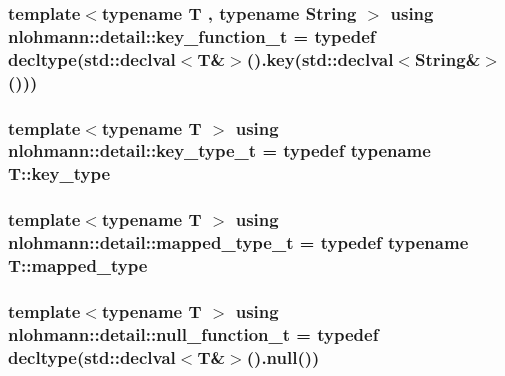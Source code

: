 \subsubsection[{\texorpdfstring{key\+\_\+function\+\_\+t}{key_function_t}}]{\setlength{\rightskip}{0pt plus 5cm}template$<$typename T , typename String $>$ using {\bf nlohmann\+::detail\+::key\+\_\+function\+\_\+t} = typedef decltype(std\+::declval$<$T\&$>$().key(std\+::declval$<$String\&$>$()))}\hypertarget{namespacenlohmann_1_1detail_a44869ca9f422b260625d78e4e8121559}{}\label{namespacenlohmann_1_1detail_a44869ca9f422b260625d78e4e8121559}
\subsubsection[{\texorpdfstring{key\+\_\+type\+\_\+t}{key_type_t}}]{\setlength{\rightskip}{0pt plus 5cm}template$<$typename T $>$ using {\bf nlohmann\+::detail\+::key\+\_\+type\+\_\+t} = typedef typename T\+::key\+\_\+type}\hypertarget{namespacenlohmann_1_1detail_a66dfe39f03b05d6b7265a0ff748d64ef}{}\label{namespacenlohmann_1_1detail_a66dfe39f03b05d6b7265a0ff748d64ef}
\subsubsection[{\texorpdfstring{mapped\+\_\+type\+\_\+t}{mapped_type_t}}]{\setlength{\rightskip}{0pt plus 5cm}template$<$typename T $>$ using {\bf nlohmann\+::detail\+::mapped\+\_\+type\+\_\+t} = typedef typename T\+::mapped\+\_\+type}\hypertarget{namespacenlohmann_1_1detail_a9c1795c148875722f8482d39e0eb9364}{}\label{namespacenlohmann_1_1detail_a9c1795c148875722f8482d39e0eb9364}
\subsubsection[{\texorpdfstring{null\+\_\+function\+\_\+t}{null_function_t}}]{\setlength{\rightskip}{0pt plus 5cm}template$<$typename T $>$ using {\bf nlohmann\+::detail\+::null\+\_\+function\+\_\+t} = typedef decltype(std\+::declval$<$T\&$>$().null())}\hypertarget{namespacenlohmann_1_1detail_ac1b4e524746bf8b790b2b776048b93c4}{}\label{namespacenlohmann_1_1detail_ac1b4e524746bf8b790b2b776048b93c4}
